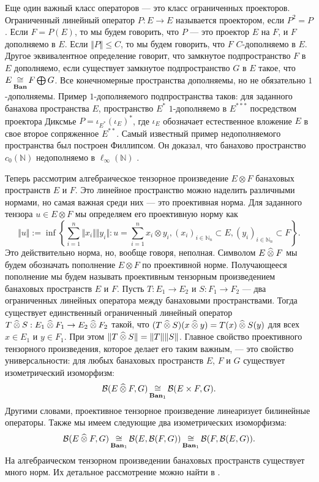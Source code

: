 Еще один важный класс операторов --- это класс ограниченных проекторов. Ограниченный линейный оператор  $P:E\to E$ называется проектором, если $P^2=P$. Если $F=P(E)$, то мы будем говорить, что $P$ --- это проектор $E$ на $F$, и $F$ дополняемо в $E$. Если $\Vert P\Vert\leq C$, то мы будем говорить, что $F$ $C$-дополняемо в $E$. Другое эквивалентное определение говорит, что замкнутое подпространство $F$ в $E$ дополняемо, если существует замкнутое подпространство $G$ в $E$ такое, что $E\mathop{\mathbin{\cong}}\limits_{\mathbf{Ban}}F\bigoplus G$. Все конечномерные пространства дополняемы, но не обязательно $1$-дополняемы. Пример $1$-дополняемого подпространства таков: для заданного банахова пространства $E$, пространство $E^*$ $1$-дополняемо в $E^{***}$ посредством проектора Диксмье $P=\iota_{E^*}(\iota_E)^*$, где $\iota_E$ обозначает естественное вложение $E$ в свое второе сопряженное $E^{**}$. Самый известный пример недополняемого пространства был построен Филлипсом. Он доказал, что банахово пространство $c_0(\mathbb{N})$ недополняемо в $\mathbb{\ell_\infty}(\mathbb{N})$ \cite{PhilOnLinTransfrm}.

Теперь рассмотрим алгебраическое тензорное произведение $E\otimes F$ банаховых пространств $E$ и $F$. Это линейное пространство можно наделить различными нормами, но самая важная среди них --- это проективная норма. Для заданного тензора $u\in E\otimes F$ мы определяем его проективную норму как
$$
\Vert u\Vert:=\inf\left\{\sum_{i=1}^n \Vert x_i\Vert\Vert y_i\Vert: u=\sum_{i=1}^n x_i\otimes y_i, (x_i)_{i\in\mathbb{N}_n}\subset E, (y_i)_{i\in\mathbb{N}_n}\subset F\right\}.
$$
Это действительно норма, но, вообще говоря, неполная. Символом $E\mathbin{\widehat{\otimes}} F$ мы будем обозначать пополнение $E\otimes F$ по проективной норме. Получающееся пополнение мы будем называть проективным тензорным произведением банаховых пространств $E$ и $F$. Пусть $T:E_1\to E_2$ и $S:F_1\to F_2$ --- два  ограниченных линейных оператора между банаховыми пространствами. Тогда существует единственный ограниченный линейный оператор $T\mathbin{\widehat{\otimes}} S:E_1\mathbin{\widehat{\otimes}} F_1\to E_2\mathbin{\widehat{\otimes}} F_2$ такой, что $(T\mathbin{\widehat{\otimes}} S)(x\mathbin{\widehat{\otimes}} y)=T(x)\mathbin{\widehat{\otimes}} S(y)$ для всех $x\in E_1$ и $y\in F_1$. При этом $\Vert T\mathbin{\widehat{\otimes}} S\Vert=\Vert T\Vert\Vert S\Vert$. Главное свойство проективного тензорного произведения, которое делает его таким важным, --- это свойство универсальности: для любых банаховых пространств $E$, $F$ и $G$ существует  изометрический изоморфизм:
$$
\mathcal{B}(E\mathbin{\widehat{\otimes}} F,G)\mathop{\mathbin{\cong}}\limits_{\mathbf{Ban}_1}\mathcal{B}(E\times F,G).
$$
Другими словами, проективное тензорное произведение линеаризует билинейные операторы. Также мы имеем следующие два  изометрических изоморфизма:
$$
\mathcal{B}(E\mathbin{\widehat{\otimes}} F,G)
\mathop{\mathbin{\cong}}\limits_{\mathbf{Ban}_1}\mathcal{B}(E,\mathcal{B}(F,G))
\mathop{\mathbin{\cong}}\limits_{\mathbf{Ban}_1}\mathcal{B}(F,\mathcal{B}(E,G)).
$$
На алгебраическом тензорном произведении банаховых пространств существует много норм. Их детальное рассмотрение можно найти в \cite{DiestMetTheoryOfTensProd}.

